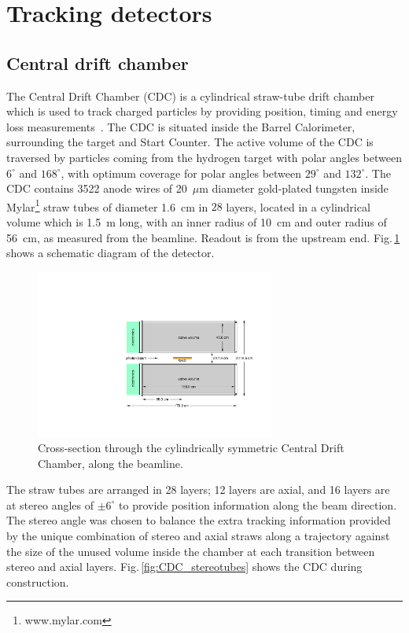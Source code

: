 \section{Tracking detectors \label{sec:tracking}}
\subsection[Central drift chamber]{Central drift chamber \label{sec:cdc}}

The Central Drift Chamber (CDC) is a cylindrical straw-tube drift chamber which is used to track charged particles by providing position, timing and energy loss measurements~\cite{VanHaarlem:2010yq,GlueXCDCNIM}.
The CDC is situated inside the Barrel Calorimeter, surrounding the target and Start Counter. 
The active volume of the CDC is traversed
by particles coming from the hydrogen target with polar angles between $6^{\circ}$ and $168^{\circ}$, with optimum 
coverage for polar angles between $29^{\circ}$ and $132^{\circ}$.  
The CDC contains 3522 anode wires of 20~$\mu$m diameter gold-plated tungsten inside Mylar\footnote{www.mylar.com} straw tubes of diameter 1.6~cm in $28$ layers,
located in a cylindrical volume which is 1.5~m long, with an inner radius of 10~cm and outer radius of 56~cm, as measured from the beamline.  
Readout is from the upstream end. 
Fig.\,\ref{fig:CDC_schematic} shows a schematic diagram of the detector.

\begin{figure}[tbp]
\begin{center}
\includegraphics[width=0.7\textwidth]{figures/CDC_schematic.pdf}  
\caption{\label{fig:CDC_schematic}          
  Cross-section through the cylindrically symmetric Central Drift Chamber, along the beamline.}  
\end{center}
\end{figure}

The straw tubes are arranged in 28 layers; 12 layers are axial, and 16 layers are at stereo angles of $\pm 6^{\circ}$ to provide position information along the beam direction.
The stereo angle was chosen to balance the extra tracking information provided by the unique combination of stereo and axial straws along a trajectory against the size of the unused volume inside the chamber at each transition between stereo and axial layers. 
Fig.\,\ref{fig:CDC_stereotubes} shows the CDC during construction. 

